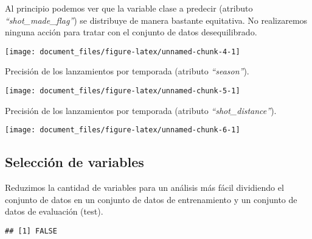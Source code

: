 \documentclass[
]{article}
\newenvironment{Shaded}{\begin{snugshade}}{\end{snugshade}}
\newcommand{\KeywordTok}[1]{\textcolor[rgb]{0.13,0.29,0.53}{\textbf{#1}}}
\newcommand{\NormalTok}[1]{#1}
\newcommand{\OperatorTok}[1]{\textcolor[rgb]{0.81,0.36,0.00}{\textbf{#1}}}
\newcommand{\StringTok}[1]{\textcolor[rgb]{0.31,0.60,0.02}{#1}}
\begin{document}
Al principio podemos ver que la variable clase a predecir (atributo
\emph{``shot\_made\_flag''}) se distribuye de manera bastante
equitativa. No realizaremos ninguna acción para tratar con el conjunto
de datos desequilibrado.

\begin{center}\texttt{[image: document\_files/figure-latex/unnamed-chunk-4-1]} \end{center}

Precisión de los lanzamientos por temporada (atributo
\emph{``season''}).

\begin{center}\texttt{[image: document\_files/figure-latex/unnamed-chunk-5-1]} \end{center}

Precisión de los lanzamientos por temporada (atributo
\emph{``shot\_distance''}).

\begin{center}\texttt{[image: document\_files/figure-latex/unnamed-chunk-6-1]} \end{center}

\hypertarget{selecciuxf3n-de-variables}{%
\subsection{\texorpdfstring{\textbf{Selección de
variables}}{Selección de variables}}\label{selecciuxf3n-de-variables}}

Reduzimos la cantidad de variables para un análisis más fácil dividiendo
el conjunto de datos en un conjunto de datos de entrenamiento y un
conjunto de datos de evaluación (test).

\begin{Shaded}
\end{Shaded}

\begin{verbatim}
## [1] FALSE
\end{verbatim}

\begin{Shaded}
\end{Shaded}
\end{document}

